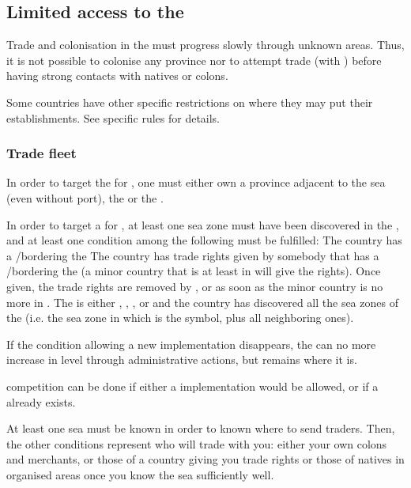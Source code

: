 \subsection{Limited access to the \ROTW}\label{chExpenses:Limited Access ROTW}

\aparag Trade and colonisation in the \ROTW must progress slowly through
unknown areas. Thus, it is not possible to colonise any province nor to
attempt trade (with \TradeFLEET) before having strong contacts with natives or
colons.

\aparag Some countries have other specific restrictions on where they may put
their establishments. See specific rules for details.


\subsubsection{Trade fleet}\label{chExpenses:Limited Access}
 In order to target the  for \TFI, one must
either own a province adjacent to the sea (even without port), the  or the .

\aparag[\ROTW \STZ] In order to target a \ROTW \STZ for \TFI, at least one sea
zone must have been discovered in the \STZ, and at least one condition among
the following must be fulfilled:
\bparag The country has a \COL/\TP bordering the \STZ
\bparag {} The country has
trade rights given by somebody that has a \COL/\TP bordering the \STZ (a minor
country that is at least in \MA will give the rights). Once given, the trade
rights are removed by , or as soon as the minor country
is no more in \MA.
\bparag The \STZ is either , , ,
 or  and the country has discovered all the sea zones
of the \STZ (i.e. the sea zone in which is the symbol, plus all neighboring
ones).

\aparag If the condition allowing a new implementation disappears, the
\TradeFLEET can no more increase in level through administrative actions, but
remains where it is.

 \TradeFLEET competition can be done if
either a \TradeFLEET implementation would be allowed, or if a \TradeFLEET
already exists.

\begin{designnote}
  At least one sea must be known in order to known where to send
  traders. Then, the other conditions represent who will trade with you:
  either your own colons and merchants, or those of a country giving you trade
  rights or those of natives in organised areas once you know the sea
  sufficiently well.
\end{designnote}

